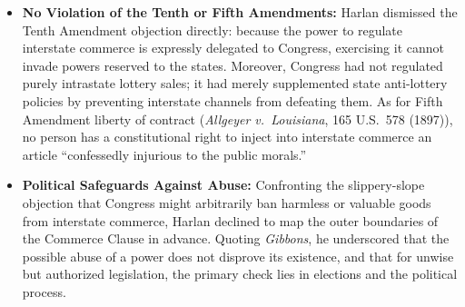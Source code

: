\documentclass[12pt]{article}
\begin{document}
\begin{itemize}
  \item \textbf{No Violation of the Tenth or Fifth Amendments:} Harlan dismissed the Tenth Amendment objection directly: because the power to regulate interstate commerce is expressly delegated to Congress, exercising it cannot invade powers reserved to the states. Moreover, Congress had not regulated purely intrastate lottery sales; it had merely supplemented state anti-lottery policies by preventing interstate channels from defeating them. As for Fifth Amendment liberty of contract (\textit{Allgeyer v.\ Louisiana}, 165 U.S.\ 578 (1897)), no person has a constitutional right to inject into interstate commerce an article ``confessedly injurious to the public morals.''
  \item \textbf{Political Safeguards Against Abuse:} Confronting the slippery-slope objection that Congress might arbitrarily ban harmless or valuable goods from interstate commerce, Harlan declined to map the outer boundaries of the Commerce Clause in advance. Quoting \textit{Gibbons}, he underscored that the possible abuse of a power does not disprove its existence, and that for unwise but authorized legislation, the primary check lies in elections and the political process.
\end{itemize}
\end{document}
